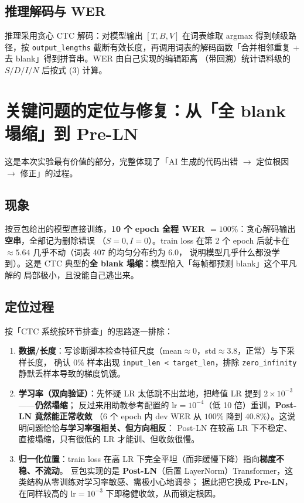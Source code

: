 \documentclass[a4paper]{article}
\begin{document}
\subsection{推理解码与 WER}
推理采用贪心 CTC 解码：对模型输出 $[T,B,V]$ 在词表维取 argmax 得到帧级路径，按 \texttt{output\_lengths}
截断有效长度，再调用词表的解码函数「合并相邻重复 + 去 blank」得到拼音串。WER 由自己实现的编辑距离
（带回溯）统计语料级的 $S/D/I/N$ 后按式 (3) 计算。

\section{关键问题的定位与修复：从「全 blank 塌缩」到 Pre-LN}
\label{sec:debug}
这是本次实验最有价值的部分，完整体现了「AI 生成的代码出错 $\rightarrow$ 定位根因 $\rightarrow$ 修正」的过程。

\subsection{现象}
按豆包给出的模型直接训练，\textbf{10 个 epoch 全程 WER $=100\%$}：贪心解码输出\textbf{空串}，全部记为删除错误
（$S{=}0,I{=}0$）。train loss 在第 2 个 epoch 后就卡在 $\approx 5.64$ 几乎不动（词表 407 的均匀分布约为 $6.0$，
说明模型几乎什么都没学到）。这是 CTC 典型的\textbf{全 blank 塌缩}：模型陷入「每帧都预测 blank」这个平凡解的
局部极小，且没能自己逃出来。

\subsection{定位过程}
按「CTC 系统按环节排查」的思路逐一排除：
\begin{enumerate}
  \item \textbf{数据/长度}：写诊断脚本检查特征尺度（mean$\approx 0$，std$\approx 3.8$，正常）与下采样长度，
        确认 $0\%$ 样本出现 \texttt{input\_len < target\_len}，排除 \texttt{zero\_infinity} 静默丢样本导致的梯度饥饿。
  \item \textbf{学习率（双向验证）}：先怀疑 LR 太低跳不出盆地，把峰值 LR 提到 $2\times10^{-3}$——\textbf{仍然塌缩}；
        反过来用助教参考配置的 $\text{lr}=10^{-4}$（低 10 倍）重训，\textbf{Post-LN 竟然能正常收敛}
        （6 个 epoch 内 dev WER 从 $100\%$ 降到 $40.8\%$）。这说明问题恰恰\textbf{与学习率强相关、但方向相反}：
        Post-LN 在较高 LR 下不稳定、直接塌缩，只有很低的 LR 才能训、但收敛很慢。
  \item \textbf{归一化位置}：train loss 在高 LR 下完全平坦（而非缓慢下降）指向\textbf{梯度不稳、不流动}。
        豆包实现的是 \textbf{Post-LN}（后置 LayerNorm）Transformer，这类结构从零训练对学习率敏感、需极小心地调参；
        据此把它换成 \textbf{Pre-LN}，在同样较高的 $\text{lr}=10^{-3}$ 下即稳健收敛，从而锁定根因。
\end{enumerate}
\end{document}

